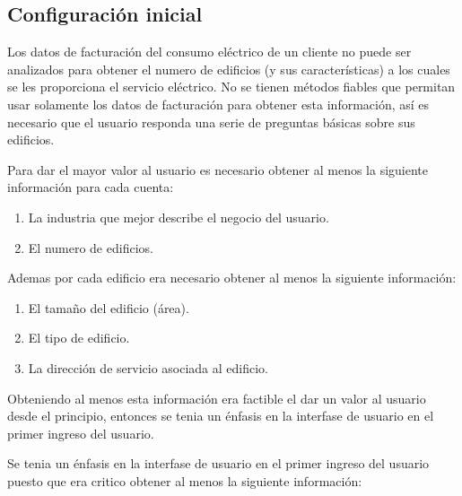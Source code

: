 \subsection{Configuración inicial}

Los datos de facturación del consumo eléctrico de un cliente no puede ser analizados
para obtener el numero de edificios (y sus características) a los cuales se les
proporciona el servicio eléctrico. No se tienen métodos fiables que permitan
usar solamente los datos de facturación para obtener esta información, así es
necesario que el usuario responda una serie de preguntas básicas sobre sus edificios.

Para dar el mayor valor al usuario es necesario obtener al menos la siguiente información
para cada cuenta:

\begin{enumerate}
\item La industria que mejor describe el negocio del usuario.
\item El numero de edificios.
\end{enumerate}

Ademas por cada edificio era necesario obtener al menos la siguiente información:

\begin{enumerate}
\item El tamaño del edificio (área).
\item El tipo de edificio.
\item La dirección de servicio asociada al edificio.
\end{enumerate}

Obteniendo al menos esta información era factible el dar un valor al usuario desde el
principio, entonces se tenia un énfasis en la interfase de usuario en el primer ingreso
del usuario.

Se tenia un énfasis en la interfase de usuario en el primer ingreso del usuario puesto
que era critico obtener al menos la siguiente información:

